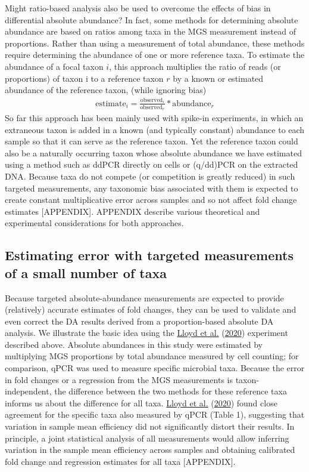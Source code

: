 \documentclass[
]{article}
\theoremstyle{definition}
\theoremstyle{definition}
\theoremstyle{definition}
\theoremstyle{definition}
\theoremstyle{remark}
\begin{document}
Might ratio-based analysis also be used to overcome the effects of bias in differential absolute abundance?
In fact, some methods for determining absolute abundance are based on ratios among taxa in the MGS measurement instead of proportions.
Rather than using a measurement of total abundance, these methods require determining the abundance of one or more reference taxa.
To estimate the abundance of a focal taxon \(i\), this approach multiplies the ratio of reads (or proportions) of taxon i to a reference taxon \(r\) by a known or estimated abundance of the reference taxon, (while ignoring bias)
\begin{align}
  \text{estimate}_{i} = \frac{\text{observed}_{i}}{\text{observed}_{r}}*\text{abundance}_{r}
\end{align}
So far this approach has been mainly used with spike-in experiments, in which an extraneous taxon is added in a known (and typically constant) abundance to each sample so that it can serve as the reference taxon.
Yet the reference taxon could also be a naturally occurring taxon whose absolute abundance we have estimated using a method such as ddPCR directly on cells or (q/dd)PCR on the extracted DNA.
Because taxa do not compete (or competition is greatly reduced) in such targeted measurements, any taxonomic bias associated with them is expected to create constant multiplicative error across samples and so not affect fold change estimates {[}APPENDIX{]}.
APPENDIX describe various theoretical and experimental considerations for both approaches.

\hypertarget{estimating-error-with-targeted-measurements-of-a-small-number-of-taxa}{%
\subsection{Estimating error with targeted measurements of a small number of taxa}\label{estimating-error-with-targeted-measurements-of-a-small-number-of-taxa}}

Because targeted absolute-abundance measurements are expected to provide (relatively) accurate estimates of fold changes, they can be used to validate and even correct the DA results derived from a proportion-based absolute DA analysis.
We illustrate the basic idea using the \protect\hyperlink{ref-lloyd2020evid}{Lloyd et al.} (\protect\hyperlink{ref-lloyd2020evid}{2020}) experiment described above.
Absolute abundances in this study were estimated by multiplying MGS proportions by total abundance measured by cell counting; for comparison, qPCR was used to measure specific microbial taxa.
Because the error in fold changes or a regression from the MGS measurements is taxon-independent, the difference between the two methods for these reference taxa informs us about the difference for all taxa.
\protect\hyperlink{ref-lloyd2020evid}{Lloyd et al.} (\protect\hyperlink{ref-lloyd2020evid}{2020}) found close agreement for the specific taxa also measured by qPCR (Table 1), suggesting that variation in sample mean efficiency did not significantly distort their results.
In principle, a joint statistical analysis of all measurements would allow inferring variation in the sample mean efficiency across samples and obtaining calibrated fold change and regression estimates for all taxa {[}APPENDIX{]}.
\end{document}
